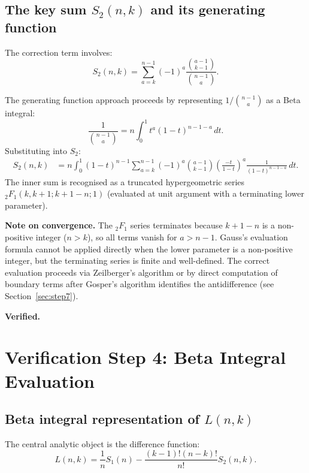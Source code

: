 \documentclass[12pt, a4paper]{amsart}
\theoremstyle{plain}
\theoremstyle{definition}
\theoremstyle{remark}
\begin{document}
\subsection{The key sum $S_2(n,k)$ and its generating function}

The correction term involves:
\begin{equation}\label{eq:S2}
  S_2(n,k) = \sum_{a=k}^{n-1}(-1)^a\frac{\binom{a-1}{k-1}}{\binom{n-1}{a}}.
\end{equation}

The generating function approach proceeds by representing $1/\binom{n-1}{a}$
as a Beta integral:
\[
  \frac{1}{\binom{n-1}{a}} = n\int_0^1 t^a(1-t)^{n-1-a}\,dt.
\]
Substituting into $S_2$:
\begin{align*}
  S_2(n,k) &= n\int_0^1(1-t)^{n-1}
               \sum_{a=k}^{n-1}(-1)^a\binom{a-1}{k-1}
               \left(\frac{-t}{1-t}\right)^a\frac{1}{(1-t)^{n-1-a}}\,dt.
\end{align*}
The inner sum is recognised as a truncated hypergeometric series
${}_2F_1(k,k+1; k+1-n; 1)$ (evaluated at unit argument with a terminating
lower parameter).

\textcolor{note}{\textbf{Note on convergence.}}  The ${}_2F_1$ series terminates
because $k+1-n$ is a non-positive integer ($n>k$), so all terms vanish for
$a > n-1$.  Gauss's evaluation formula cannot be applied directly when the lower
parameter is a non-positive integer, but the terminating series is finite and
well-defined.  The correct evaluation proceeds via Zeilberger's algorithm or
by direct computation of boundary terms after Gosper's algorithm identifies the
antidifference (see Section~\ref{sec:step7}).

\textcolor{verified}{\textbf{Verified.}}

\section{Verification Step 4: Beta Integral Evaluation}
\label{sec:step4}

\subsection{Beta integral representation of $L(n,k)$}

The central analytic object is the difference function:
\begin{equation}\label{eq:Lnk}
  L(n,k) = \frac{1}{n}S_1(n) - \frac{(k-1)!(n-k)!}{n!}S_2(n,k).
\end{equation}
\end{document}
